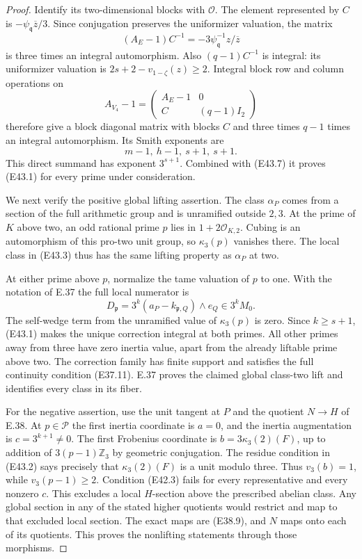 \begin{proof}
Identify its two-dimensional blocks with
$\mathcal O$. The element represented by $C$ is
$-\psi_{\mathfrak q}\overline z/3$.
Since conjugation preserves the uniformizer
valuation, the matrix
\[
       (A_E-1)C^{-1}
            =-3\psi_{\mathfrak q}^{-1}z/\overline z
\]
is three times an integral automorphism. Also
$(q-1)C^{-1}$ is integral: its uniformizer
valuation is $2s+2-v_{1-\zeta}(z)\ge2$.
Integral block row and column operations on
\[
 A_{V_4}-1=\begin{pmatrix}A_E-1&0\\C&(q-1)I_2\end{pmatrix}
\]
therefore give a block diagonal matrix with
blocks $C$ and three times $q-1$ times an
integral automorphism. Its Smith exponents are
\[
                 m-1,\ h-1,\ s+1,\ s+1.
 \tag{E43.9}
\]
This direct summand has exponent $3^{s+1}$.
Combined with (E43.7) it proves (E43.1) for
every prime under consideration.

We next verify the positive global lifting assertion.
The class $\alpha_P$ comes from a section of the
full arithmetic group and is unramified outside
$2,3$. At the prime of $K$ above two, an odd
rational prime $p$ lies in $1+2\mathcal O_{K,2}$.
Cubing is an automorphism of this pro-two unit
group, so $\kappa_3(p)$ vanishes there. The
local class in (E43.3) thus has the same lifting
property as $\alpha_P$ at two.

At either prime above $p$, normalize the tame
valuation of $p$ to one. With the notation of
E.37 the full local numerator is
\[
 D_{\mathfrak p}
       =3^k(a_P-k_{\mathfrak p,Q})\wedge e_Q
                   \in3^k M_0.
 \tag{E43.10}
\]
The self-wedge term from the unramified value of
$\kappa_3(p)$ is zero. Since $k\ge s+1$, (E43.1)
makes the unique correction integral at both
primes. All other primes away from three have
zero inertia value, apart from the already
liftable prime above two. The correction family
has finite support and satisfies the full
continuity condition (E37.11). E.37 proves the
claimed global class-two lift and identifies
every class in its fiber.

For the negative assertion, use the unit tangent
at $P$ and the quotient $N\to H$ of E.38.
At $p\in\mathcal P$ the first inertia coordinate
is $a=0$, and the inertia augmentation is
$c=3^{k+1}\ne0$. The first Frobenius coordinate
is $b=3\kappa_3(2)(F)$, up to addition of
$3(p-1)\mathbb Z_3$ by geometric conjugation.
The residue condition in (E43.2) says precisely
that $\kappa_3(2)(F)$ is a unit modulo three.
Thus $v_3(b)=1$, while $v_3(p-1)\ge2$.
Condition (E42.3) fails for every representative
and every nonzero $c$. This excludes a local
$H$-section above the prescribed abelian class.
Any global section in any of the stated higher
quotients would restrict and map to that
excluded local section. The exact maps are
(E38.9), and $N$ maps onto each of its quotients.
This proves the nonlifting statements through
those morphisms.


\end{proof}

